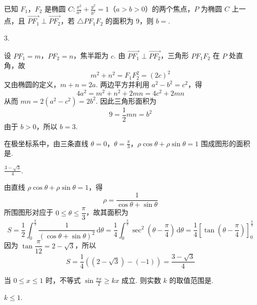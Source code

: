\begin{problem}
已知 \(F_1\)，\(F_2\) 是椭圆 \(C: \frac{x^2}{a^2} + \frac{y^2}{b^2} = 1\)（\(a > b > 0\)）的两个焦点，\(P\) 为椭圆 \(C\) 上一点，且 \(\overrightarrow{PF_1} \perp \overrightarrow{PF_2}\)，若 \(\triangle PF_1F_2\) 的面积为 \(9\)，则 \(b =\)\fillinblank{}.
\end{problem}

\begin{answer}
\(3\).
\end{answer}

\begin{solution}
设 \(PF_1=m\)，\(PF_2=n\)，焦半距为 \(c\). 由 \(\overrightarrow{PF_1}\perp\overrightarrow{PF_2}\)，三角形 \(PF_1F_2\) 在 \(P\) 处直角，故
\[
m^2+n^2=F_1F_2^2=(2c)^2
\]
又由椭圆的定义，\(m+n=2a\). 两边平方并利用 \(a^2-b^2=c^2\)，得
\[
4a^2=m^2+n^2+2mn=4c^2+2mn
\]
从而 \(mn=2(a^2-c^2)=2b^2\). 因此三角形面积为
\[
9=\frac12mn=b^2
\]
由于 \(b>0\)，所以 \(b=3\).
\end{solution}

\begin{problem}
在极坐标系中，由三条直线 \(\theta = 0\)，\(\theta = \frac{\pi}{3}\)，\(\rho \cos \theta + \rho \sin \theta = 1\) 围成图形的面积是\fillinblank{}.
\end{problem}

\begin{answer}
\(\frac{3 - \sqrt{3}}{4}\).
\end{answer}

\begin{solution}
由直线 \(\rho\cos\theta+\rho\sin\theta=1\)，得
\[
\rho=\frac{1}{\cos\theta+\sin\theta}
\]
所围图形对应于 \(0\leqslant\theta\leqslant\dfrac{\pi}{3}\)，故其面积为
\[
S=\frac12\int_0^{\frac{\pi}{3}}\frac{1}{(\cos\theta+\sin\theta)^2}\,\mathrm d\theta
=\frac14\int_0^{\frac{\pi}{3}}\sec^2\left(\theta-\frac{\pi}{4}\right)\,\mathrm d\theta
=\frac14\left[\tan\left(\theta-\frac{\pi}{4}\right)\right]_0^{\frac{\pi}{3}}
\]
因为 \(\tan\dfrac{\pi}{12}=2-\sqrt3\)，所以
\[
S=\frac14\left((2-\sqrt3)-(-1)\right)=\frac{3-\sqrt3}{4}
\]
\end{solution}

\begin{problem}
当 \(0 \leqslant x \leqslant 1\) 时，不等式 \(\sin \frac{\pi x}{2} \geqslant kx\) 成立. 则实数 \(k\) 的取值范围是\fillinblank{}.
\end{problem}

\begin{answer}
\(k \leqslant 1\).
\end{answer}

